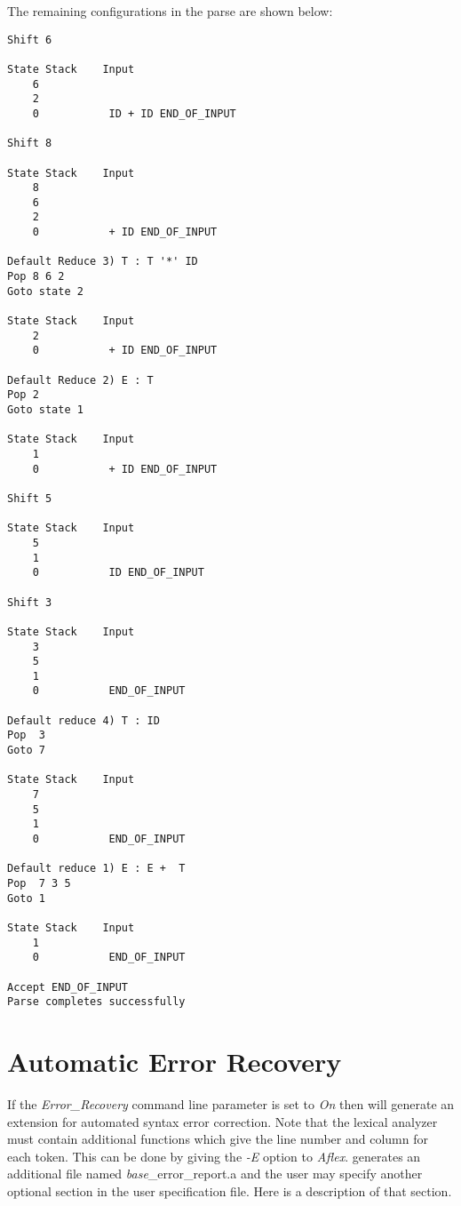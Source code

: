 The remaining configurations in the parse are shown below:

\begin{verbatim}
Shift 6

State Stack    Input
    6
    2
    0           ID + ID END_OF_INPUT

Shift 8

State Stack    Input
    8
    6
    2
    0           + ID END_OF_INPUT

Default Reduce 3) T : T '*' ID
Pop 8 6 2
Goto state 2

State Stack    Input
    2
    0           + ID END_OF_INPUT

Default Reduce 2) E : T
Pop 2
Goto state 1

State Stack    Input
    1
    0           + ID END_OF_INPUT

Shift 5

State Stack    Input
    5
    1
    0           ID END_OF_INPUT

Shift 3

State Stack    Input
    3
    5
    1
    0           END_OF_INPUT

Default reduce 4) T : ID
Pop  3
Goto 7

State Stack    Input
    7
    5
    1
    0           END_OF_INPUT

Default reduce 1) E : E +  T
Pop  7 3 5
Goto 1

State Stack    Input
    1
    0           END_OF_INPUT

Accept END_OF_INPUT
Parse completes successfully
\end{verbatim}
\newpage
\section{Automatic Error Recovery}
If the {\it Error\_Recovery} command line parameter is set to {\it On}
then \ayacc will generate an extension for automated syntax error
correction.  Note that the lexical analyzer must contain additional
functions which give the line number and column for each token.  This
can be done by giving the {\it -E} option to {\it Aflex}.
\ayacc generates an additional file named {\it
base}\_error\_report.a and the user may specify another optional
section in the user specification file.  Here is a description of that
section.

